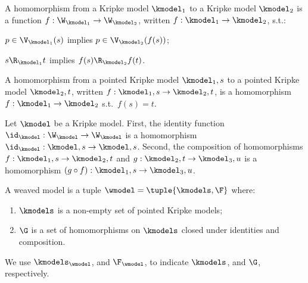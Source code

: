 {
\color{blue}
\begin{definition}\label{def:homomorphism}
  A homomorphism from a Kripke model $\kmodel_1$ to a Kripke model $\kmodel_2$ is a function $f: \W_{\kmodel_1} \to \W_{\kmodel_2}$, written $f: \kmodel_1 \to \kmodel_2$, s.t.:
    \begin{description}
      \setlength{\itemsep}{0pt}
      \item[\textnormal{(inclusion)}] $p \in \V_{\kmodel_1}(s)$ implies $p \in \V_{\kmodel_2}(f(s))$;
      \item[\textnormal{(forth)}] $s \R_{\kmodel_1} t$ implies $f(s) \R_{\kmodel_2} f(t)$.
    \end{description}
  A homomorphism from a pointed Kripke model $\kmodel_1, s$ to a pointed Kripke model $\kmodel_2, t$, written $f: \kmodel_1,s \to \kmodel_2, t$, is a homomorphism $f: \kmodel_1 \to \kmodel_2$ s.t.\ $f(s) = t$.
\end{definition}

\begin{proposition}
  Let $\kmodel$ be a Kripke model.
  First, the identity function $\id_{\kmodel}: {\W_{\kmodel} \to \W_{\kmodel}}$ is a homomorphism $\id_{\kmodel}: \kmodel,s \to \kmodel,s$.
  Second, the composition of homomorphisms $f: \kmodel_1,s \to \kmodel_2,t$ and $g: \kmodel_2,t \to \kmodel_3,u$ is a homomorphism $(g \circ f): \kmodel_1,s \to \kmodel_3,u$.
\end{proposition}

\begin{definition}\label{def:wmodel:pointed}
  A weaved model is a tuple $\wmodel = \tuple{\kmodels, \F}$ where:
  \begin{enumerate}
    \setlength{\itemsep}{0pt}
    \item $\kmodels$ is a non-empty set of pointed Kripke models;
    \item $\G$ is a set of homomorphisms on $\kmodels$ closed under identities and composition.
  \end{enumerate}
  We use $\kmodels_{\wmodel}$, and $\F_{\wmodel}$, to indicate $\kmodels$, and $\G$, respectively.
\end{definition}


}
